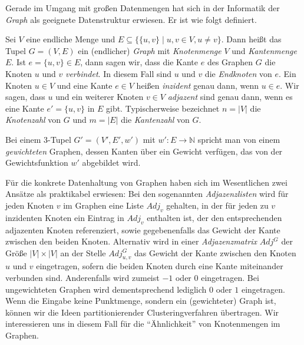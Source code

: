 Gerade im Umgang mit großen Datenmengen hat sich in der Informatik der \emph{Graph} als geeignete Datenstruktur erwiesen. Er
ist wie folgt definiert.

\begin{definition}[Graph]
\label{def:graph}
	Sei $V$ eine endliche Menge und $E \subseteq \{ \{ u,v \} \mid u, v \in V, u \neq v \}$.
	Dann heißt das Tupel $G = (V, E)$ ein (endlicher) \emph{Graph} mit \emph{Knotenmenge} $V$ und
	\emph{Kantenmenge} $E$. Ist $e = \{ u,v \} \in E$, dann sagen wir, dass die Kante $e$ des Graphen $G$
	die Knoten $u$ und $v$ \emph{verbindet}. In diesem Fall sind $u$ und $v$ die \emph{Endknoten}
	von $e$.
	Ein Knoten $u \in V$ und eine Kante $e \in V$ heißen \emph{inzident}
	genau dann, wenn $u \in e$. Wir sagen, dass $u$ und ein weiterer Knoten $v \in V$ \emph{adjazent}
	sind genau dann, wenn es eine Kante $e' = \{ u,v \}$ in $E$ gibt.
	Typischerweise bezeichnet $n = \left|V\right|$ die \emph{Knotenzahl} von $G$ und
	$m = \left|E\right|$ die \emph{Kantenzahl} von $G$.
	
	Bei einem 3-Tupel $G' = (V', E', w')$ mit $w' : E \rightarrow \mathbb{N}$ spricht man von einem \emph{gewichteten} Graphen,
	dessen Kanten über ein Gewicht verfügen, das von der Gewichtsfunktion $w'$ abgebildet wird.
\end{definition}
Für die konkrete Datenhaltung von Graphen haben sich im Wesentlichen zwei Ansätze als praktikabel erwiesen: Bei den sogenannten
\emph{Adjazenzlisten} wird für jeden Knoten $v$ im Graphen eine Liste $Adj_v$ gehalten, in der für jeden zu $v$ inzidenten
Knoten ein Eintrag in $Adj_v$ enthalten ist, der den entsprechenden adjazenten Knoten referenziert, sowie gegebenenfalls das
Gewicht der Kante zwischen den beiden Knoten.
Alternativ wird in einer
\emph{Adjazenzmatrix} $Adj^G$ der Größe $\left|V\right| \times \left|V\right|$ an der Stelle $Adj^G_{u,v}$ das Gewicht der Kante
zwischen den Knoten $u$ und $v$ eingetragen, sofern die beiden Knoten durch eine Kante miteinander verbunden sind.
Anderenfalls wird zumeist $-1$ oder $0$ eingetragen. Bei ungewichteten Graphen wird dementsprechend lediglich $0$ oder $1$
eingetragen.
\absatz
Wenn die Eingabe keine Punktmenge, sondern ein (gewichteter) Graph ist, können wir die Ideen partitionierender Clusteringverfahren
übertragen. Wir interessieren uns in diesem Fall für die "`Ähnlichkeit"' von Knotenmengen im Graphen.

